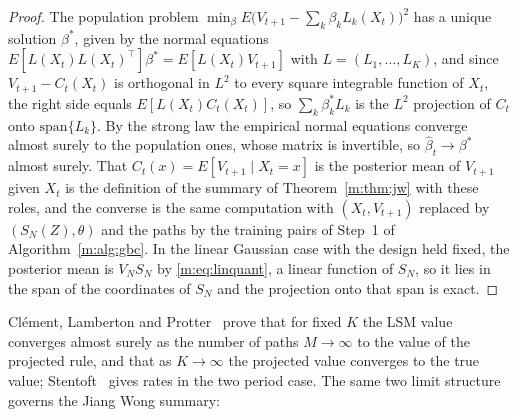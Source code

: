 \begin{proof}
The population problem $\min_\beta E\big(V_{t+1}-\sum_k\beta_kL_k(X_t)\big)^2$ has a unique solution $\beta^*$, given by the normal equations $E[L(X_t)L(X_t)^\top]\beta^*=E[L(X_t)V_{t+1}]$ with $L=(L_1,\dots,L_K)$, and since $V_{t+1}-C_t(X_t)$ is orthogonal in $L^2$ to every square integrable function of $X_t$, the right side equals $E[L(X_t)C_t(X_t)]$, so $\sum_k\beta^*_kL_k$ is the $L^2$ projection of $C_t$ onto $\mathrm{span}\{L_k\}$. By the strong law the empirical normal equations converge almost surely to the population ones, whose matrix is invertible, so $\hat\beta_t\to\beta^*$ almost surely. That $C_t(x)=E[V_{t+1}\mid X_t=x]$ is the posterior mean of $V_{t+1}$ given $X_t$ is the definition of the summary of Theorem~\ref{m:thm:jw} with these roles, and the converse is the same computation with $(X_t,V_{t+1})$ replaced by $(S_N(Z),\theta)$ and the paths by the training pairs of Step~1 of Algorithm~\ref{m:alg:gbc}. In the linear Gaussian case with the design held fixed, the posterior mean is $V_NS_N$ by \eqref{m:eq:linquant}, a linear function of $S_N$, so it lies in the span of the coordinates of $S_N$ and the projection onto that span is exact.
\end{proof}

Cl\'ement, Lamberton and Protter~\cite{clement2002} prove that for fixed $K$ the LSM value converges almost surely as the number of paths $M\to\infty$ to the value of the projected rule, and that as $K\to\infty$ the projected value converges to the true value; Stentoft~\cite{stentoft2004} gives rates in the two period case. The same two limit structure governs the Jiang Wong summary:

